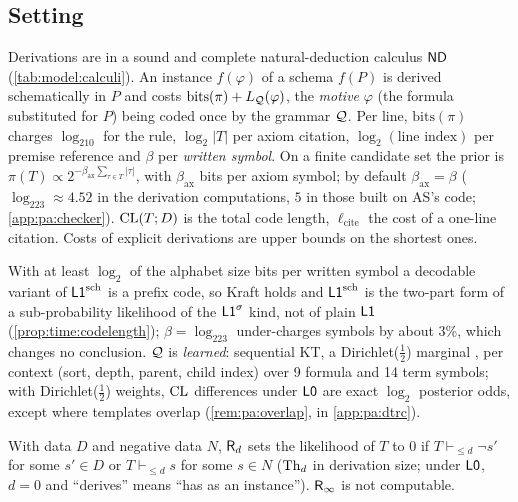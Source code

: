 \subsection{Setting}\label{sec:pa:setting}

\begin{definition}\pabrk{}\label{def:pa:lsch}
Derivations are in a sound and complete natural-deduction calculus $\mathsf{ND}$ (\cref{tab:model:calculi}). An instance $f(\varphi)$ of a schema $f(P)$ is derived schematically in $P$ and costs $\mathrm{bits}(\pi)+L_{\mathcal{Q}}(\varphi)$, the \emph{motive} $\varphi$ (the formula substituted for $P$) being coded once by the grammar $\mathcal{Q}$. Per line, $\mathrm{bits}(\pi)$ charges $\log_210$ for the rule, $\log_2|T|$ per axiom citation, $\log_2(\text{line index})$ per premise reference and $\beta$ per \emph{written symbol}. On a finite candidate set the prior is $\pi(T)\propto2^{-\beta_{\mathrm{ax}}\sum_{\tau\in T}|\tau|}$, with $\beta_{\mathrm{ax}}$ bits per axiom symbol; by default $\beta_{\mathrm{ax}}=\beta$ ($\log_223\approx4.52$ in the derivation computations, $5$ in those built on AS's code; \cref{app:pa:checker}). $\mathrm{CL}(T;D)$ is the total code length, $\ell_{\mathrm{cite}}$ the cost of a one-line citation. Costs of explicit derivations are upper bounds on the shortest ones.
\end{definition}

\noindent With at least $\log_2$ of the alphabet size bits per written symbol a decodable variant of $\mathord{\mathsf{L1}}^{\mathrm{sch}}$ is a prefix code, so Kraft holds  and $\mathord{\mathsf{L1}}^{\mathrm{sch}}$ is the two-part form of a sub-probability likelihood of the $\mathord{\mathsf{L1}}^{\sigma}$ kind, not of plain $\mathord{\mathsf{L1}}$ (\cref{prop:time:codelength}); $\beta=\log_223$ under-charges symbols by about 3\%, which changes no conclusion. $\mathcal{Q}$ is \emph{learned}: sequential KT, a Dirichlet($\frac12$) marginal \citep{krichevsky1981performance}, per context (sort, depth, parent, child index) over 9 formula and 14 term symbols; with Dirichlet($\frac12$) weights, $\mathrm{CL}$ differences under $\mathord{\mathsf{L0}}$ are exact $\log_2$ posterior odds, except where templates overlap (\cref{rem:pa:overlap}, in \cref{app:pa:dtrc}).

\begin{definition}\pabrk{}\label{def:pa:refute}
With data $D$ and negative data $N$, $\mathsf{R}_{d}$ sets the likelihood of $T$ to $0$ if $T\vdash_{\le d}\neg s'$ for some $s'\in D$ or $T\vdash_{\le d}s$ for some $s\in N$ ($\mathrm{Th}_d$ in derivation size; under $\mathord{\mathsf{L0}}$, $d=0$ and ``derives'' means ``has as an instance''). $\mathsf{R}_{\infty}$ is not computable.
\end{definition}

